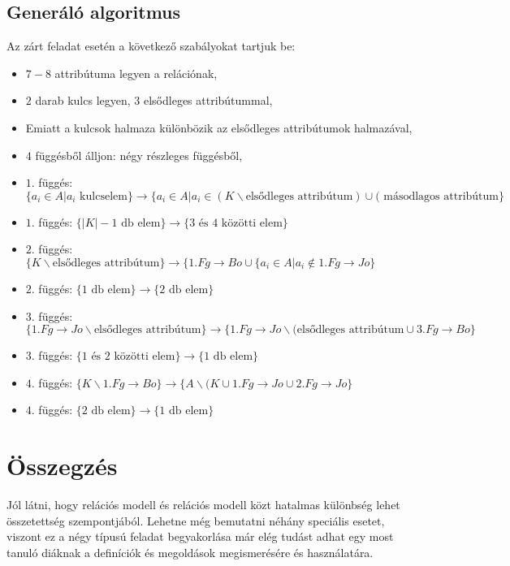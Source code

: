 \subsection{Generáló algoritmus}
Az zárt feladat esetén a következő szabályokat tartjuk be:
\begin{itemize}
    \item $7-8$ attribútuma legyen a relációnak,
    \item $2$ darab kulcs legyen, $3$ elsődleges attribútummal, 
    \item Emiatt a kulcsok halmaza különbözik az elsődleges attribútumok halmazával,
    \item $4$ függésből álljon: négy részleges függésből,
    \item $1.$ függés: $\big\{ a_i \in A \big| a_i \text{ kulcselem}  \big\} \longrightarrow \big\{  a_i \in A \big| a_i \in (K \backslash \text{elsődleges attribútum}) \cup (\text{ másodlagos attribútum}   \big\}$ 
    \item $1.$ függés: $\big \{ |K|-1 \text{ db elem} \big\} \longrightarrow \big\{ 3 \text{ és } 4 \text{ közötti elem} \big \}$
    \item $2.$ függés: $\big\{ K \backslash \text{elsődleges attribútum} \big\} \longrightarrow \big\{ 1.Fg \rightarrow Bo \cup \{ a_i \in A \big| a_i \not \in 1.Fg \rightarrow Jo  \big\}$ 
    \item $2.$ függés: $\big \{ 1 \text{ db elem} \big\} \longrightarrow \big\{ 2 \text{ db elem} \big \}$
    \item $3.$ függés: $\big\{  1.Fg \rightarrow Jo \backslash \text{elsődleges attribútum} \big\} \longrightarrow \big\{ 1.Fg \rightarrow Jo \backslash (\text{elsődleges attribútum} \cup 3.Fg \rightarrow Bo  \big \}$
    \item $3.$ függés: $\big \{ 1 \text{ és } 2 \text{ közötti elem} \big\} \longrightarrow \big\{1 \text{ db elem} \big \}$
    \item $4.$ függés: $\big\{ K \backslash 1.Fg \rightarrow Bo \big\} \longrightarrow \big\{ A \backslash (K \cup 1.Fg \rightarrow Jo \cup 2.Fg \rightarrow Jo  \big \}$
    \item $4.$ függés: $\big \{ 2 \text{ db elem} \big\} \longrightarrow \big\{1 \text{ db elem} \big \}$
\end{itemize}

\section{Összegzés}

Jól látni, hogy relációs modell és relációs modell közt hatalmas különbség lehet összetettség szempontjából. Lehetne még bemutatni néhány speciális esetet, viszont ez a négy típusú feladat begyakorlása már elég tudást adhat egy most tanuló diáknak a definíciók és megoldások megismerésére és használatára. 